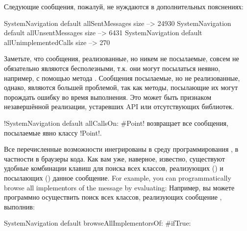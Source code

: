 \documentclass[a4paper,10pt,twoside]{book}
\begin{document}
Следующие сообщения, пожалуй, не нуждаются в дополнительных пояснениях:

\begin{code}{}
SystemNavigation default allSentMessages size          --> 24930
SystemNavigation default allUnsentMessages size      --> 6431
SystemNavigation default allUnimplementedCalls size --> 270
\end{code}

Заметьте, что сообщения, реализованные, но никем не посылаемые, совсем не обязательно являются бесполезными, т.к. они могут посылаться неявно, например, с помощью метода .
Сообщения посылаемые, но не реализованные, однако, являются большей проблемой, так как методы, посылающие их могут порождать ошибку во время выполнения.
Это может быть признаком незавершённой реализации, устаревших API или отсутствующих библиотек.

\ct!SystemNavigation default allCallsOn: #Point! возвращает все сообщения, посылаемые явно классу \ct!Point!.

Все перечисленные возможности инегрированы в среду программирования \pharo, в частности в браузеры кода.
Как вам уже, наверное, известно, существуют удобные комбинации клавиш для поиска всех классов, реализующих () и посылающих () данное сообщение.
For example, you can programmatically browse all implementors of the message  by evaluating:
Например, вы можете программно осуществить поиск всех классов, реализующих сообщение , выполнив:
\begin{code}{}
SystemNavigation default browseAllImplementorsOf: #ifTrue:
\end{code}
\end{document}
